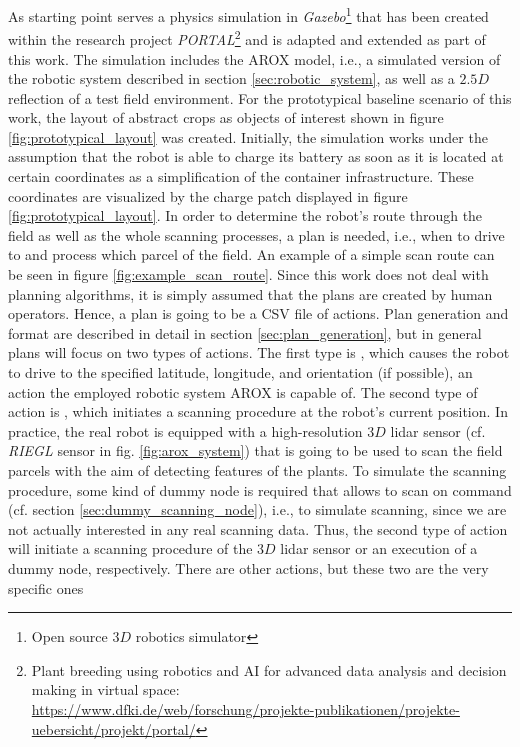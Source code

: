 \documentclass[english, master, utf8]{base/thesis_KBS}
\newcommand{\code}{\collectverb{\codebox}}
\begin{document}
As starting point serves a physics simulation in \textit{Gazebo}\footnote{Open source $3D$ robotics simulator} that has been created within the research project
\textit{PORTAL}\footnote{Plant breeding using robotics and AI for advanced data analysis and decision making in virtual space:\\
\textcolor{link-color}{\url{https://www.dfki.de/web/forschung/projekte-publikationen/projekte-uebersicht/projekt/portal/}}}
and is adapted and extended as part of this work. The simulation includes the AROX model, i.e., a simulated version of the robotic system described in section \ref{sec:robotic_system},
as well as a $2.5D$ reflection of a test field environment. For the prototypical baseline scenario of this work, the layout of abstract crops as objects of interest shown in 
figure \ref{fig:prototypical_layout} was created. Initially, the simulation works under the assumption that the robot is able to charge its battery as soon as it is located at 
certain coordinates as a simplification of the container infrastructure. These coordinates are visualized by the charge patch displayed in figure \ref{fig:prototypical_layout}.
In order to determine the robot's route through the field as well as the whole scanning processes, a plan is needed, i.e., when to drive to and process which parcel of the field. 
An example of a simple scan route can be seen in figure \ref{fig:example_scan_route}. Since this work does not deal with planning algorithms, it is simply assumed that the plans
are created by human operators. Hence, a plan is going to be a CSV file of actions. Plan generation and format are described in detail in section \ref{sec:plan_generation}, 
but in general plans will focus on two types of actions. The first type is \code{drive_to(lat, lng, theta)}, which causes the robot to drive to the specified latitude, 
longitude, and orientation (if possible), an action the employed robotic system AROX is capable of. The second type of action is \code{scan}, which initiates a scanning procedure
at the robot's current position. In practice, the real robot is equipped with a high-resolution $3D$ lidar sensor (cf. \textit{RIEGL} sensor in fig. \ref{fig:arox_system}) that is going 
to be used to scan the field parcels with the aim of detecting features of the plants. To simulate the scanning procedure, some kind of dummy node is required that allows to 
scan on command (cf. section \ref{sec:dummy_scanning_node}), i.e., to simulate scanning, since we are not actually interested in any real scanning data. Thus, the second type 
of action will initiate a scanning procedure of the $3D$ lidar sensor or an execution of a dummy node, respectively. There are other actions, but these two are the very specific ones
\end{document}

